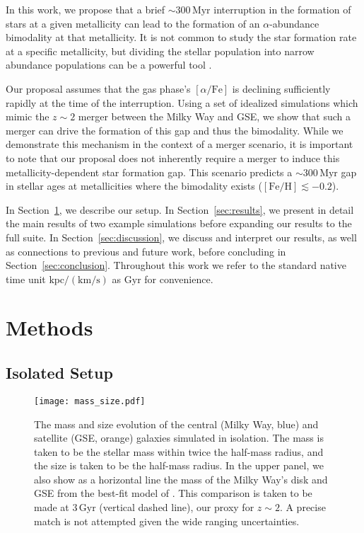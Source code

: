 \documentclass[twocolumn,linenumbers,trackchanges]{aastex631}
\newcommand{\Gyr}{\ensuremath{\textrm{Gyr}}}
\newcommand{\Myr}{\ensuremath{\textrm{Myr}}}
\newcommand{\kpc}{\ensuremath{\textrm{kpc}}}
\newcommand{\kms}{\ensuremath{\textrm{km}/\textrm{s}}}
\newcommand{\FeH}{\ensuremath{[\textrm{Fe}/\textrm{H}]}}
\newcommand{\alphaFe}{\ensuremath{[\alpha/\textrm{Fe}]}}
\begin{document}
In this work, we propose that a brief $\sim300\,\Myr$ interruption in the formation of stars at a given metallicity can lead to the formation of an $\alpha$-abundance bimodality at that metallicity. It is not common to study the star formation rate at a specific metallicity, but dividing the stellar population into narrow abundance populations can be a powerful tool \citep[e.g.][]{2012ApJ...753..148B,2012ApJ...751..131B}.

Our proposal assumes that the gas phase's \alphaFe{} is declining sufficiently rapidly at the time of the interruption. Using a set of idealized simulations which mimic the $z\sim2$ merger between the Milky Way and GSE, we show that such a merger can drive the formation of this gap and thus the bimodality. While we demonstrate this mechanism in the context of a merger scenario, it is important to note that our proposal does not inherently require a merger to induce this metallicity-dependent star formation gap. This scenario predicts a $\sim300\,\Myr$ gap in stellar ages at metallicities where the bimodality exists ($\FeH\lesssim-0.2$).

In Section~\ref{sec:methods}, we describe our setup. In Section~\ref{sec:results}, we present in detail the main results of two example simulations before expanding our results to the full suite. In Section~\ref{sec:discussion}, we discuss and interpret our results, as well as connections to previous and future work, before concluding in Section~\ref{sec:conclusion}. Throughout this work we refer to the standard native time unit $\kpc/\left(\kms\right)$ as \Gyr{} for convenience.

\section{Methods}\label{sec:methods}
\subsection{Isolated Setup}\label{ssec:iso_setup}
\begin{figure}
    \centering
    \texttt{[image: mass\_size.pdf]}
    \caption{The mass and size evolution of the central (Milky Way, blue) and satellite (GSE, orange) galaxies simulated in isolation. The mass is taken to be the stellar mass within twice the half-mass radius, and the size is taken to be the half-mass radius. In the upper panel, we also show as a horizontal line the mass of the Milky Way's disk and GSE from the best-fit model of \citet{2021ApJ...923...92N}. This comparison is taken to be made at $3\,\Gyr$ (vertical dashed line), our proxy for $z\sim2$. A precise match is not attempted given the wide ranging uncertainties.}
    \label{fig:mass_size}
\end{figure}
\end{document}
